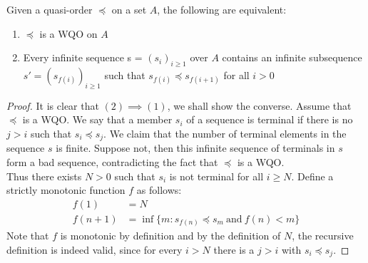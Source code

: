 \documentclass[a4paper]{article}
\begin{document}
\begin{lemma}
Given a quasi-order $\preccurlyeq$ on a set $A$, the following are equivalent:
	\begin{enumerate}
		\item $\preccurlyeq$ is a WQO on $A$
		\item Every infinite sequence s = $(s_i)_{i \geq 1}$ over $A$ contains an infinite subsequence $s' = (s_{f(i)})_{i \geq 1}$ such that $s_{f(i)} \preccurlyeq s_{f(i+1)}$ for all $i > 0$
	\end{enumerate}
\end{lemma}
\begin{proof}
	It is clear that $(2) \implies (1)$, we shall show the converse. Assume that $\preccurlyeq$ is a WQO. We say that a member $s_i$ of a sequence is terminal if there is no $j > i$ such that $s_i \preccurlyeq s_j$. We claim that the number of terminal elements in the sequence $s$ is finite. Suppose not, then this infinite sequence of terminals in $s$ form a bad sequence, contradicting the fact that $\preccurlyeq$ is a WQO.\\
	Thus there exists $N > 0$ such that $s_i$ is not terminal for all $i \geq N$. Define a strictly monotonic function $f$ as follows:
	\begin{equation*}
	\begin{split}
	f(1) &= N \\
	f(n+1) &= \inf\{ m : s_{f(n)} \preccurlyeq s_m \  \text{and} \ f(n) < m \}
	\end{split}
	\end{equation*}
	Note that $f$ is monotonic by definition and by the definition of $N$, the recursive definition is indeed valid, since for every $i > N$ there is a $j > i$ with $s_i \preccurlyeq s_j$.
\end{proof}
\end{document}
